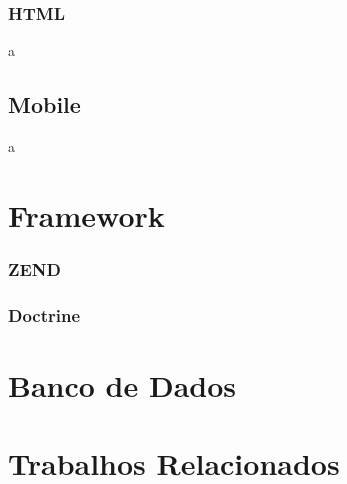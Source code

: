 \subsubsection{HTML}
a

\subsection{Mobile}
a

\section{Framework}
\subsubsection{ZEND}
\subsubsection{Doctrine}
\section{Banco de Dados}
\section{Trabalhos Relacionados}


